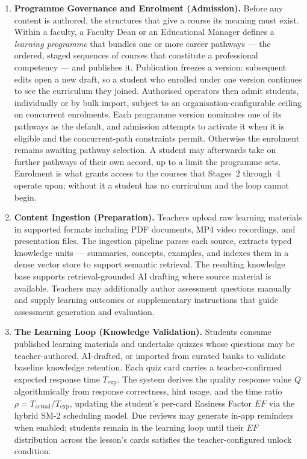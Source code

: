 \begin{enumerate}

    \item \textbf{Programme Governance and Enrolment (Admission).}
    Before any content is authored, the structures that give a course
    its meaning must exist. Within a faculty, a Faculty Dean or an
    Educational Manager defines a \textit{learning programme} that
    bundles one or more career pathways --- the ordered, staged
    sequences of courses that constitute a professional competency ---
    and publishes it. Publication freezes a version: subsequent edits
    open a new draft, so a student who enrolled under one version
    continues to see the curriculum they joined. Authorised operators
    then admit students, individually or by bulk import, subject to an
    organisation-configurable ceiling on concurrent enrolments. Each
    programme version nominates one of its pathways as the default,
    and admission attempts to activate it when it is eligible and the
    concurrent-path constraints permit. Otherwise the enrolment remains
    awaiting pathway selection. A student may afterwards take on further
    pathways of their own accord, up to a limit the programme sets.
    Enrolment is what grants access to the courses that Stages~2
    through~4 operate upon; without it a student has no curriculum and
    the loop cannot begin.

    \item \textbf{Content Ingestion (Preparation).}
    Teachers upload raw learning materials in supported formats 
    including PDF documents, MP4 video recordings, and presentation 
    files. The ingestion pipeline parses each source, extracts typed
    knowledge units — summaries, concepts, examples, and indexes
    them in a dense vector store to support semantic retrieval. The
    resulting knowledge base supports retrieval-grounded AI drafting
    where source material is available. Teachers may additionally
    author assessment questions manually and supply learning outcomes
    or supplementary instructions that guide assessment generation and
    evaluation.

    \item \textbf{The Learning Loop (Knowledge Validation).}
    Students consume published learning materials and undertake quizzes
    whose questions may be teacher-authored, AI-drafted, or imported
    from curated banks to validate baseline knowledge retention. Each
    quiz card carries a teacher-confirmed expected response time
    $T_{\text{exp}}$. The system derives the quality response value
    $Q$ algorithmically from response correctness, hint usage, and
    the time ratio $\rho = T_{\text{actual}} / T_{\text{exp}}$,
    updating the student's per-card Easiness Factor $EF$ via the
    hybrid SM-2 scheduling model. Due reviews may generate in-app
    reminders when enabled; students remain in the learning loop until
    their $EF$ distribution across the lesson's cards satisfies the
    teacher-configured unlock condition.


\end{enumerate}
